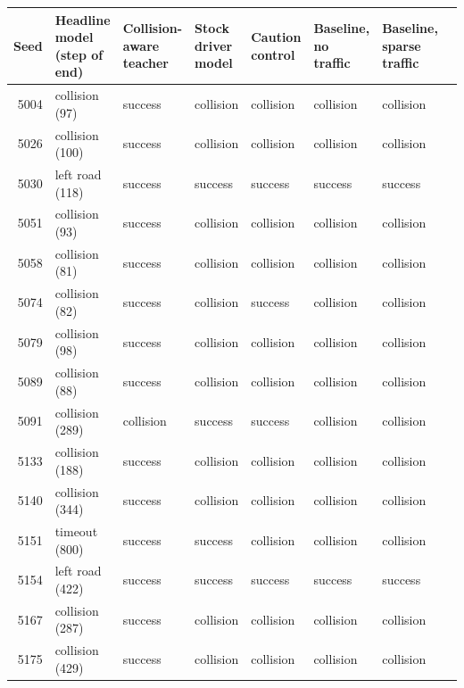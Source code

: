 \begin{tabular}{@{}rlllllll@{}}\toprule
Seed & Headline model (step of end) & Collision-aware teacher & Stock driver model & Caution control & Baseline, no traffic & Baseline, sparse traffic\\\midrule
5004 & collision (97) & success & collision & collision & collision & collision\\
5026 & collision (100) & success & collision & collision & collision & collision\\
5030 & left road (118) & success & success & success & success & success\\
5051 & collision (93) & success & collision & collision & collision & collision\\
5058 & collision (81) & success & collision & collision & collision & collision\\
5074 & collision (82) & success & collision & success & collision & collision\\
5079 & collision (98) & success & collision & collision & collision & collision\\
5089 & collision (88) & success & collision & collision & collision & collision\\
5091 & collision (289) & collision & success & success & collision & collision\\
5133 & collision (188) & success & collision & collision & collision & collision\\
5140 & collision (344) & success & collision & collision & collision & collision\\
5151 & timeout (800) & success & success & collision & collision & collision\\
5154 & left road (422) & success & success & success & success & success\\
5167 & collision (287) & success & collision & collision & collision & collision\\
5175 & collision (429) & success & collision & collision & collision & collision\\
\bottomrule\end{tabular}
